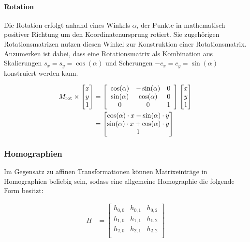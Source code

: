 \paragraph{Rotation}
\label{par:rotation}

Die Rotation erfolgt anhand eines Winkels $\alpha$, der Punkte in mathematisch positiver Richtung um den Koordinatenursprung rotiert. Sie zugehörigen Rotationsmatrizen nutzen diesen Winkel zur Konstruktion einer Rotationsmatrix. Anzumerken ist dabei, dass eine Rotationsmatrix als Kombination aus Skalierungen $s_x = s_y = \cos(\alpha)$ und Scherungen $-c_x = c_y = \sin(\alpha)$ konstruiert werden kann.

\begin{align*}
    M_\text{rot} \times \begin{bmatrix} x \\ y \\ 1 \\ \end{bmatrix}
     & =
    \left[
        \begin{array}{ccc}
            \cos(\alpha) & -\sin(\alpha) & 0 \\
            \sin(\alpha) & \cos(\alpha)  & 0 \\
            0            & 0             & 1 \\
        \end{array}
        \right]
    \begin{bmatrix} x \\ y \\ 1 \\ \end{bmatrix}                                                                                     \\
     & =
    \begin{bmatrix} \cos(\alpha) \cdot x - \sin(\alpha) \cdot y \\ \sin(\alpha) \cdot x + \cos(\alpha) \cdot y \\ 1 \\ \end{bmatrix} \\
\end{align*}


\subsubsection{Homographien}
\label{sec:homographien}

Im Gegensatz zu affinen Transformationen können Matrixeinträge in Homographien beliebig sein, sodass eine allgemeine Homographie die folgende Form besitzt:

\begin{align*}
    H & =
    \left[
        \begin{array}{ccc}
            h_{0, 0} & h_{0, 1} & h_{0, 2} \\
            h_{1, 0} & h_{1, 1} & h_{1, 2} \\
            h_{2, 0} & h_{2, 1} & h_{2, 2} \\
        \end{array}
        \right]
\end{align*}

